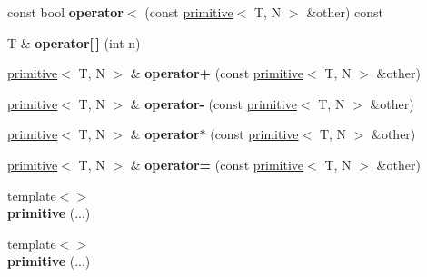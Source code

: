 \begin{DoxyCompactItemize}
\item 
\hypertarget{classprimitive_a8a3fceb6591fc649e2808a433468d79b}{}const bool {\bfseries operator$<$} (const \hyperlink{classprimitive}{primitive}$<$ T, N $>$ \&other) const \label{classprimitive_a8a3fceb6591fc649e2808a433468d79b}

\item 
\hypertarget{classprimitive_a69f2af38b5df19e6f85020d66580c431}{}T \& {\bfseries operator\mbox{[}$\,$\mbox{]}} (int n)\label{classprimitive_a69f2af38b5df19e6f85020d66580c431}

\item 
\hypertarget{classprimitive_ab42f11f4d2665e34f8026e1fe8682073}{}\hyperlink{classprimitive}{primitive}$<$ T, N $>$ \& {\bfseries operator+} (const \hyperlink{classprimitive}{primitive}$<$ T, N $>$ \&other)\label{classprimitive_ab42f11f4d2665e34f8026e1fe8682073}

\item 
\hypertarget{classprimitive_a1bf05a54852d26b8d4400cd9d420fd76}{}\hyperlink{classprimitive}{primitive}$<$ T, N $>$ \& {\bfseries operator-\/} (const \hyperlink{classprimitive}{primitive}$<$ T, N $>$ \&other)\label{classprimitive_a1bf05a54852d26b8d4400cd9d420fd76}

\item 
\hypertarget{classprimitive_a8b6eff36902b86d1c380b6e781b1b2c1}{}\hyperlink{classprimitive}{primitive}$<$ T, N $>$ \& {\bfseries operator$\ast$} (const \hyperlink{classprimitive}{primitive}$<$ T, N $>$ \&other)\label{classprimitive_a8b6eff36902b86d1c380b6e781b1b2c1}

\item 
\hypertarget{classprimitive_ae3d7c8936d130162506c4141849d41e0}{}\hyperlink{classprimitive}{primitive}$<$ T, N $>$ \& {\bfseries operator=} (const \hyperlink{classprimitive}{primitive}$<$ T, N $>$ \&other)\label{classprimitive_ae3d7c8936d130162506c4141849d41e0}

\item 
\hypertarget{classprimitive_a867946b2d75fb1abecce0b4643b20e98}{}{\footnotesize template$<$$>$ }\\{\bfseries primitive} (...)\label{classprimitive_a867946b2d75fb1abecce0b4643b20e98}

\item 
\hypertarget{classprimitive_af96205d423f1166a81df3b21f640981e}{}{\footnotesize template$<$$>$ }\\{\bfseries primitive} (...)\label{classprimitive_af96205d423f1166a81df3b21f640981e}

\end{DoxyCompactItemize}
